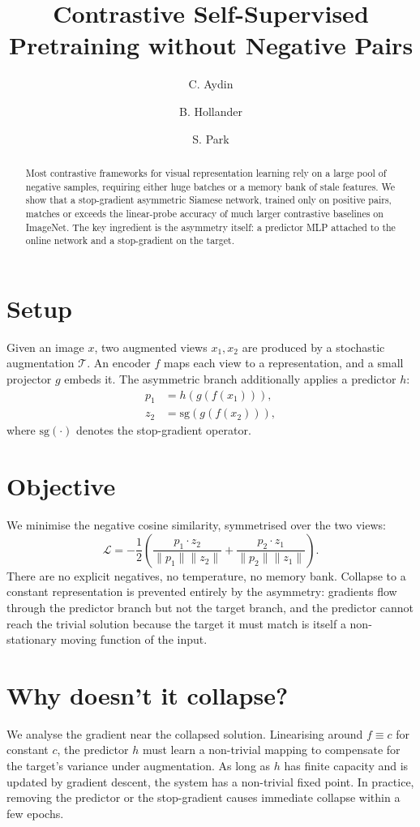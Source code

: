 \documentclass[11pt]{article}
\title{Contrastive Self-Supervised Pretraining without Negative Pairs}
\author{C. Aydin \and B. Hollander \and S. Park}
\date{}
\begin{document}
\maketitle

\begin{abstract}
Most contrastive frameworks for visual representation learning rely on a
large pool of negative samples, requiring either huge batches or a memory
bank of stale features. We show that a stop-gradient asymmetric Siamese
network, trained only on positive pairs, matches or exceeds the linear-probe
accuracy of much larger contrastive baselines on ImageNet. The key
ingredient is the asymmetry itself: a predictor MLP attached to the online
network and a stop-gradient on the target.
\end{abstract}

\section{Setup}
Given an image $x$, two augmented views $x_1, x_2$ are produced by a stochastic
augmentation $\mathcal{T}$. An encoder $f$ maps each view to a representation,
and a small projector $g$ embeds it. The asymmetric branch additionally applies
a predictor $h$:
\begin{align}
p_1 &= h(g(f(x_1))), \\
z_2 &= \mathrm{sg}(g(f(x_2))),
\end{align}
where $\mathrm{sg}(\cdot)$ denotes the stop-gradient operator.

\section{Objective}
We minimise the negative cosine similarity, symmetrised over the two views:
\begin{equation}
\mathcal{L} = -\frac{1}{2}\!\left( \frac{p_1 \cdot z_2}{\|p_1\| \|z_2\|}
                                  + \frac{p_2 \cdot z_1}{\|p_2\| \|z_1\|}
                            \right).
\end{equation}
There are no explicit negatives, no temperature, no memory bank. Collapse to
a constant representation is prevented entirely by the asymmetry: gradients
flow through the predictor branch but not the target branch, and the
predictor cannot reach the trivial solution because the target it must match
is itself a non-stationary moving function of the input.

\section{Why doesn't it collapse?}
We analyse the gradient near the collapsed solution. Linearising around
$f \equiv c$ for constant $c$, the predictor $h$ must learn a non-trivial
mapping to compensate for the target's variance under augmentation. As long
as $h$ has finite capacity and is updated by gradient descent, the system
has a non-trivial fixed point. In practice, removing the predictor or the
stop-gradient causes immediate collapse within a few epochs.
\end{document}
